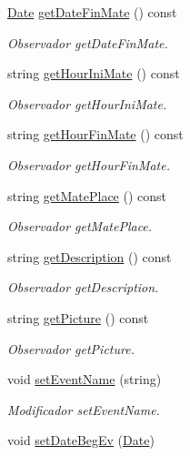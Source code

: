 \begin{DoxyCompactItemize}
\hyperlink{class_date}{Date} \hyperlink{class_event_a8676a4856cdb6e84f78ca1fa9988b2ca}{get\+Date\+Fin\+Mate} () const 
\begin{DoxyCompactList}\small\item\em Observador get\+Date\+Fin\+Mate. \end{DoxyCompactList}\item 
string \hyperlink{class_event_a7bd9666f47f9dceaca300482653778de}{get\+Hour\+Ini\+Mate} () const 
\begin{DoxyCompactList}\small\item\em Observador get\+Hour\+Ini\+Mate. \end{DoxyCompactList}\item 
string \hyperlink{class_event_ab0b79d0fde419c36eeddce0974aa29b0}{get\+Hour\+Fin\+Mate} () const 
\begin{DoxyCompactList}\small\item\em Observador get\+Hour\+Fin\+Mate. \end{DoxyCompactList}\item 
string \hyperlink{class_event_a8dfff443f2f78fd86705afe00b8e0489}{get\+Mate\+Place} () const 
\begin{DoxyCompactList}\small\item\em Observador get\+Mate\+Place. \end{DoxyCompactList}\item 
string \hyperlink{class_event_aaaf95f81e1f746ef936bacb569306b05}{get\+Description} () const 
\begin{DoxyCompactList}\small\item\em Observador get\+Description. \end{DoxyCompactList}\item 
string \hyperlink{class_event_aa85b8f3c2d3f220e87b80396767fc746}{get\+Picture} () const 
\begin{DoxyCompactList}\small\item\em Observador get\+Picture. \end{DoxyCompactList}\item 
void \hyperlink{class_event_aa72ec9ac1dc30b3afdf8a0da60d92e31}{set\+Event\+Name} (string)\hypertarget{class_event_aa72ec9ac1dc30b3afdf8a0da60d92e31}{}\label{class_event_aa72ec9ac1dc30b3afdf8a0da60d92e31}

\begin{DoxyCompactList}\small\item\em Modificador set\+Event\+Name. \end{DoxyCompactList}\item 
void \hyperlink{class_event_ac8d69d760bad23c2aefea2c5b48cb8f8}{set\+Date\+Beg\+Ev} (\hyperlink{class_date}{Date})\hypertarget{class_event_ac8d69d760bad23c2aefea2c5b48cb8f8}{}\label{class_event_ac8d69d760bad23c2aefea2c5b48cb8f8}


\end{DoxyCompactItemize}
